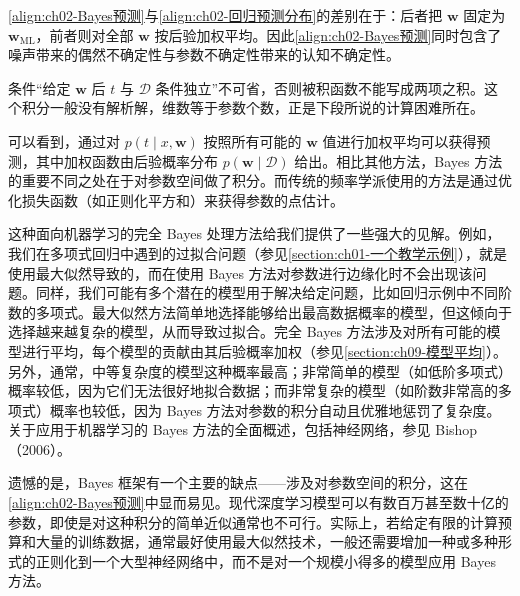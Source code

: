 \documentclass[../../main.tex]{subfiles}
\begin{document}
\begin{remark}
\eqref{align:ch02-Bayes预测}与\eqref{align:ch02-回归预测分布}的差别在于：后者把 $\mathbf{w}$ 固定为 $\mathbf{w}_{\mathrm{ML}}$，前者则对全部 $\mathbf{w}$ 按后验加权平均。因此\eqref{align:ch02-Bayes预测}同时包含了噪声带来的偶然不确定性与参数不确定性带来的认知不确定性。

条件“给定 $\mathbf{w}$ 后 $t$ 与 $\mathcal{D}$ 条件独立”不可省，否则被积函数不能写成两项之积。这个积分一般没有解析解，维数等于参数个数，正是下段所说的计算困难所在。
\end{remark}

可以看到，通过对 $p(t\mid x,\mathbf{w})$ 按照所有可能的 $\mathbf{w}$ 值进行加权平均可以获得预测，其中加权函数由后验概率分布 $p(\mathbf{w}\mid\mathcal{D})$ 给出。相比其他方法，Bayes 方法的重要不同之处在于对参数空间做了积分。而传统的频率学派使用的方法是通过优化损失函数（如正则化平方和）来获得参数的点估计。

这种面向机器学习的完全 Bayes 处理方法给我们提供了一些强大的见解。例如，我们在多项式回归中遇到的过拟合问题（参见\cref{section:ch01-一个教学示例}），就是使用最大似然导致的，而在使用 Bayes 方法对参数进行边缘化时不会出现该问题。同样，我们可能有多个潜在的模型用于解决给定问题，比如回归示例中不同阶数的多项式。最大似然方法简单地选择能够给出最高数据概率的模型，但这倾向于选择越来越复杂的模型，从而导致过拟合。完全 Bayes 方法涉及对所有可能的模型进行平均，每个模型的贡献由其后验概率加权（参见\cref{section:ch09-模型平均}）。另外，通常，中等复杂度的模型这种概率最高；非常简单的模型（如低阶多项式）概率较低，因为它们无法很好地拟合数据；而非常复杂的模型（如阶数非常高的多项式）概率也较低，因为 Bayes 方法对参数的积分自动且优雅地惩罚了复杂度。关于应用于机器学习的 Bayes 方法的全面概述，包括神经网络，参见 Bishop（2006）。

遗憾的是，Bayes 框架有一个主要的缺点——涉及对参数空间的积分，这在\eqref{align:ch02-Bayes预测}中显而易见。现代深度学习模型可以有数百万甚至数十亿的参数，即使是对这种积分的简单近似通常也不可行。实际上，若给定有限的计算预算和大量的训练数据，通常最好使用最大似然技术，一般还需要增加一种或多种形式的正则化到一个大型神经网络中，而不是对一个规模小得多的模型应用 Bayes 方法。
\end{document}
